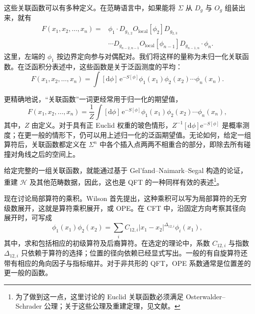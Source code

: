 这些关联函数可以有多种定义。在范畴语言中，如果能将 $\Sigma$ 从 $D_g$ 与 $O_g$ 组装出来，就有
\begin{equation}\label{eq:3.23}
\begin{aligned}
F(x_1,x_2,\ldots,x_n)
={}&\phi_1\cdot D_{g_{1,2}}O_{\mathrm{local}}[\phi_2]D_{g_{2,3}}\\
&\cdots D_{g_{n-2,n-1}}O_{\mathrm{local}}[\phi_{n-1}]
D_{g_{n-1,n}}\cdot\phi_n.
\end{aligned}
\end{equation}
这里，左端的 $\phi_1$ 按边界定向参与对偶配对。我们将这样的量称为未归一化关联函数。在泛函积分表述中，这些函数是关于泛函测度的平均：
\begin{equation}\label{eq:3.24}
F(x_1,x_2,\ldots,x_n)
=\int[\mathrm{d}\phi]\,\mathrm{e}^{-S[\phi]}
\phi_1(x_1)\phi_2(x_2)\cdots\phi_n(x_n).
\end{equation}

更精确地说，“关联函数”一词更经常用于归一化的期望值，
\begin{equation}\label{eq:3.25}
F(x_1,x_2,\ldots,x_n)
=\frac1Z\int[\mathrm{d}\phi]\,\mathrm{e}^{-S[\phi]}
\phi_1(x_1)\phi_2(x_2)\cdots\phi_n(x_n),
\end{equation}
其中，$Z$ 由定义。对于具有正 Euclid 权重的玻色情形，$Z^{-1}[\mathrm{d}\phi]\mathrm{e}^{-S[\phi]}$ 是概率测度；在更一般的情形下，仍可以用上述归一化的泛函期望值。无论如何，给定一组算符后，关联函数都定义在 $\Sigma^n$ 中各个插入点两两不相重合的部分，即除去所有碰撞对角线之后的空间上。

给定完整的一组关联函数，就能通过基于 Gel'fand--Naimark--Segal 构造的论证，重建 $\mathcal{H}$ 及其他范畴数据，因此，这也是 QFT 的一种同样有效的表述\footnote{为了做到这一点，这里讨论的 Euclid 关联函数必须满足 Osterwalder--Schrader 公理；关于这些公理及重建定理，见文献。}。

\begin{definition*}\label{def:3.ope}
现在讨论局部算符的乘积。Wilson 首先提出，这种乘积可以写为局部算符的无穷级数展开，这就是算符乘积展开，或 OPE。在 CFT 中，沿固定方向考察其径向展开时，可写成
\begin{equation}\label{eq:3.26}
\phi_1(x_1)\phi_2(x_2)
=\sum_iC_{12,i}|x_1-x_2|^{\Delta_{12,i}}\phi_i(x_1),
\end{equation}
其中，求和包括相应的初级算符及后裔算符。在选定的理论中，系数 $C_{12,i}$ 与指数 $\Delta_{12,i}$ 只依赖于算符的选择；位置的径向依赖已经显式写出。一般的有自旋算符还带有相应的角向因子与指标缩并。对于非共形的 QFT，OPE 系数通常是位置差的更一般的函数。
\end{definition*}

